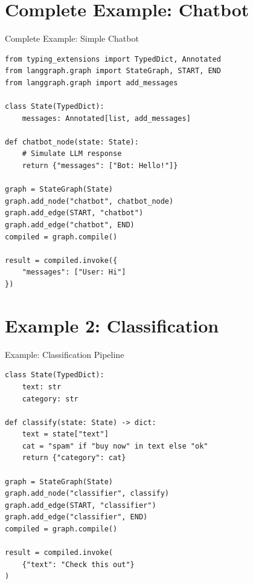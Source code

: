 \documentclass[aspectratio=169,11pt]{beamer}
\begin{document}
\section{Complete Example: Chatbot}
\begin{frame}[fragile,t,shrink=3]{Complete Example: Simple Chatbot}
\vspace{0.05cm}

\begin{codebox}
\begin{lstlisting}
from typing_extensions import TypedDict, Annotated
from langgraph.graph import StateGraph, START, END
from langgraph.graph import add_messages

class State(TypedDict):
    messages: Annotated[list, add_messages]

def chatbot_node(state: State):
    # Simulate LLM response
    return {"messages": ["Bot: Hello!"]}

graph = StateGraph(State)
graph.add_node("chatbot", chatbot_node)
graph.add_edge(START, "chatbot")
graph.add_edge("chatbot", END)
compiled = graph.compile()

result = compiled.invoke({
    "messages": ["User: Hi"]
})
\end{lstlisting}
\end{codebox}
\end{frame}

\section{Example 2: Classification}
\begin{frame}[fragile,t,shrink=4]{Example: Classification Pipeline}
\vspace{0.05cm}

\begin{codebox}[Classifier]
\begin{lstlisting}
class State(TypedDict):
    text: str
    category: str

def classify(state: State) -> dict:
    text = state["text"]
    cat = "spam" if "buy now" in text else "ok"
    return {"category": cat}

graph = StateGraph(State)
graph.add_node("classifier", classify)
graph.add_edge(START, "classifier")
graph.add_edge("classifier", END)
compiled = graph.compile()

result = compiled.invoke(
    {"text": "Check this out"}
)
\end{lstlisting}
\end{codebox}
\end{frame}
\end{document}
